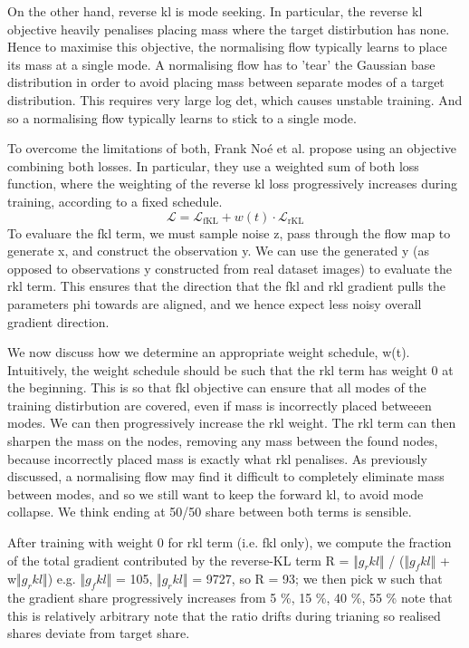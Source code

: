 \documentclass[12pt,a4paper]{report}
\begin{document}
On the other hand, reverse kl is mode seeking. 
In particular, the reverse kl objective heavily penalises placing mass where the target distirbution has none. 
Hence to maximise this objective, the normalising flow typically learns to place its mass at a single mode. 
A normalising flow has to 'tear' the Gaussian base distribution in order to avoid placing mass between separate modes of a target distribution. This requires very large log det, which causes unstable training. And so a normalising flow typically learns to stick to a single mode. 

To overcome the limitations of both, Frank Noé et al. propose using an objective combining both losses. In particular, they use a weighted sum of both loss function, where the weighting of the reverse kl loss progressively increases during training, according to a fixed schedule. 
\[
\mathcal{L} = \mathcal{L}_{\text{fKL}} + w(t) \cdot \mathcal{L}_{\text{rKL}}
\]
To evaluare the fkl term, we must sample noise z, pass through the flow map to generate x, and construct the observation y. 
We can use the generated y (as opposed to observations y constructed from real dataset images) to evaluate the rkl term. 
This ensures that the direction that the fkl and rkl gradient pulls the parameters phi towards are aligned, and we hence expect less noisy overall gradient direction. 

We now discuss how we determine an appropriate weight schedule, w(t). 
Intuitively, the weight schedule should be such that the rkl term has weight 0 at the beginning. 
This is so that fkl objective can ensure that all modes of the training distirbution are covered, even if mass is incorrectly placed betweeen modes. 
We can then progressively increase the rkl weight. 
The rkl term can then sharpen the mass on the nodes, removing any mass between the found nodes, because incorrectly placed mass is exactly what rkl penalises. 
As previously discussed, a normalising flow may find it difficult to completely eliminate mass between modes, and so we still want to keep the forward kl, to avoid mode collapse. 
We think ending at 50/50 share between both terms is sensible. 

After training with weight 0 for rkl term (i.e. fkl only), we compute the fraction of the total gradient contributed by the reverse-KL term
R = ‖$g_rkl$‖ / (‖$g_fkl$‖ + w‖$g_rkl$‖) e.g.  ‖$g_fkl$‖ = 105, ‖$g_rkl$‖ = 9727, so R = 93;
we then pick w such that the gradient share progressively increases from 5 \%, 15 \%, 40 \%, 55 \%
note that this is relatively arbitrary
note that the ratio drifts during trianing so realised shares deviate from target share. 
\end{document}
